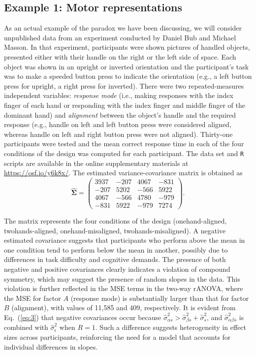 \documentclass[preprint,12pt,authoryear]{elsarticle}
\begin{document}

\subsection{Example 1: Motor representations}
\label{sec3.1}

As an actual example of the paradox we have been discussing, we will consider unpublished data from an experiment conducted by Daniel Bub and Michael Masson. In that experiment, participants were shown pictures of handled objects, presented either with their handle on the right or the left side of space. Each object was shown in an upright or inverted orientation and the participant's task was to make a speeded button press to indicate the orientation (e.g., a left button press for upright, a right press for inverted). There were two repeated-measures independent variables: \textit{response mode} (i.e., making responses with the index finger of each hand or responding with the index finger and middle finger of the dominant hand) and \textit{alignment} between the object's handle and the required response (e.g., handle on left and left button press were considered aligned, whereas handle on left and right button press were not aligned). Thirty-one participants were tested and the mean correct response time in each of the four conditions of the design was computed for each participant. The data set and \texttt{R} scripts are available in the online supplementary materials at \url{https://osf.io/y6k8x/}. The estimated variance-covariance matrix is obtained as
\begin{equation*}
	\hat{\boldsymbol{\Sigma}}=\begin{pmatrix} 3937 & -207 & 4067 & -831 \\ -207 & 5202 & -566 & 5922 \\ 4067 & -566 & 4780 & -979 \\ -831 & 5922 & -979 & 7274 \end{pmatrix}.
\end{equation*}

The matrix represents the four conditions of the design (onehand-aligned, twohands-aligned, onehand-misaligned, twohands-misaligned). A negative estimated covariance suggests that participants who perform above the mean in one condition tend to perform below the mean in another, possibly due to differences in task difficulty and cognitive demands. The presence of both negative and positive covariances clearly indicates a violation of compound symmetry, which may suggest the presence of random slopes in the data. This violation is further reflected in the MSE terms in the two-way rANOVA, where the MSE for factor $A$ (response mode) is substantially larger than that for factor $B$ (alignment), with values of 11,585 and 409, respectively. It is evident from Eq.~(\ref{eq:3}) that negative covariances occur because ${\hat{\sigma}}_{\alpha s}^2>{\hat{\sigma}}_{\beta s}^2+{\hat{\sigma}}_s^2$, and ${\hat{\sigma}}_{\alpha\beta s}^2$ is combined with ${\hat{\sigma}}_\epsilon^2$ when $R=1$. Such a difference suggests heterogeneity in effect sizes across participants, reinforcing the need for a model that accounts for individual differences in slopes.
\end{document}
